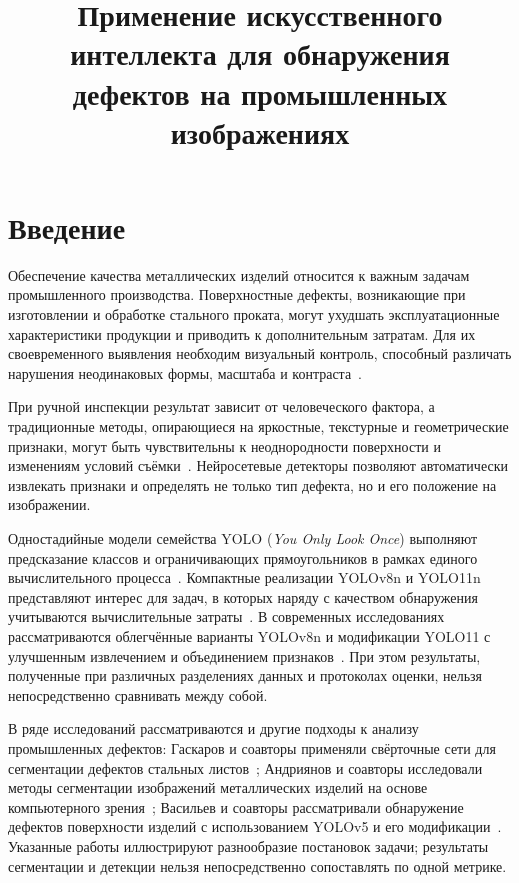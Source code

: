 \documentclass{misisarticle}
\title{Применение искусственного интеллекта для обнаружения дефектов на промышленных изображениях}
\begin{document}
\maketitle

\section{Введение}
Обеспечение качества металлических изделий относится к важным задачам промышленного производства. Поверхностные дефекты, возникающие при изготовлении и обработке стального проката, могут ухудшать эксплуатационные характеристики продукции и приводить к дополнительным затратам. Для их своевременного выявления необходим визуальный контроль, способный различать нарушения неодинаковых формы, масштаба и контраста~\cite{ibrahim2024}.

При ручной инспекции результат зависит от человеческого фактора, а традиционные методы, опирающиеся на яркостные, текстурные и геометрические признаки, могут быть чувствительны к неоднородности поверхности и изменениям условий съёмки~\cite{ibrahim2024,chazhoor2024}. Нейросетевые детекторы позволяют автоматически извлекать признаки и определять не только тип дефекта, но и его положение на изображении.

Одностадийные модели семейства YOLO (\textit{You Only Look Once}) выполняют предсказание классов и ограничивающих прямоугольников в рамках единого вычислительного процесса~\cite{redmon2016}. Компактные реализации YOLOv8n и YOLO11n представляют интерес для задач, в которых наряду с качеством обнаружения учитываются вычислительные затраты~\cite{jocher2023,jocher2024}. В современных исследованиях рассматриваются облегчённые варианты YOLOv8n и модификации YOLO11 с улучшенным извлечением и объединением признаков~\cite{liu2024,ni2025,li2026}. При этом результаты, полученные при различных разделениях данных и протоколах оценки, нельзя непосредственно сравнивать между собой.

В ряде исследований рассматриваются и другие подходы к анализу промышленных дефектов: Гаскаров и соавторы применяли свёрточные сети для сегментации дефектов стальных листов~\cite{gaskarov2020}; Андриянов и соавторы исследовали методы сегментации изображений металлических изделий на основе компьютерного зрения~\cite{andriyanov2023}; Васильев и соавторы рассматривали обнаружение дефектов поверхности изделий с использованием YOLOv5 и его модификации~\cite{vasiliev2024}. Указанные работы иллюстрируют разнообразие постановок задачи; результаты сегментации и детекции нельзя непосредственно сопоставлять по одной метрике.
\end{document}
